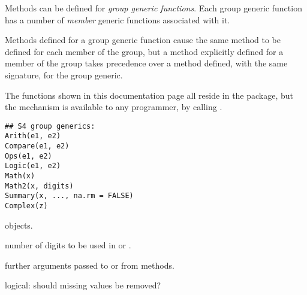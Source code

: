 %
\begin{Description}\relax
Methods can be defined  for \emph{group
generic functions}.  Each group generic function has a number of
\emph{member} generic functions associated with it.

Methods  defined for a group generic function cause the same
method to be defined for each member of the group, but a method explicitly
defined for a  member of the group takes precedence over a
method defined, with the same signature, for the group generic.

The functions shown in this documentation page all reside in the
 package, but the mechanism is available to any
programmer, by calling .
\end{Description}
%
\begin{Usage}
\begin{verbatim}
## S4 group generics:
Arith(e1, e2)
Compare(e1, e2)
Ops(e1, e2)
Logic(e1, e2)
Math(x)
Math2(x, digits)
Summary(x, ..., na.rm = FALSE)
Complex(z)
\end{verbatim}
\end{Usage}
%
\begin{Arguments}
\begin{ldescription}
\item[\code{x, z, e1, e2}] objects.
\item[\code{digits}] number of digits to be used in  or .
\item[\code{...}] further arguments passed to or from methods.
\item[\code{na.rm}] logical: should missing values be removed?
\end{ldescription}
\end{Arguments}
%
